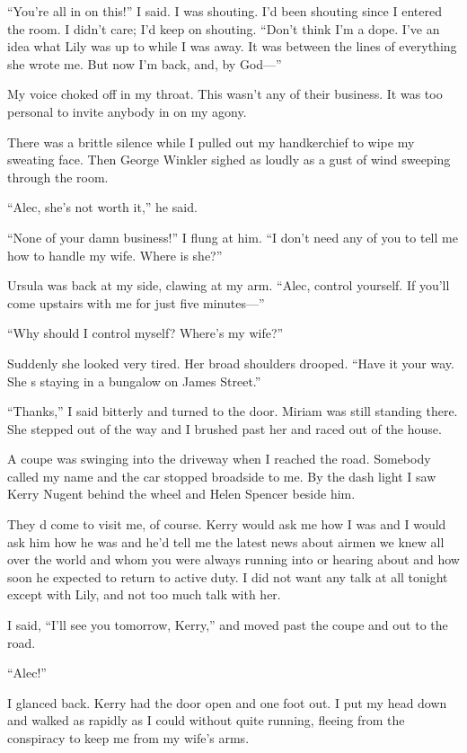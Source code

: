 \documentclass{novel}
\begin{document}
{“You’re all in on this!” I said. I was shouting. I’d been shouting since I entered the room. I didn’t care; I’d keep on shouting. “Don’t think I’m a dope. I’ve an idea what Lily was up to while I was away. It was between the lines of everything she wrote me. But now I’m back, and, by God—”

My voice choked off in my throat. This wasn’t any of their business. It was too personal to invite anybody in on my agony.

There was a brittle silence while I pulled out my handkerchief to wipe my sweating face. Then George Winkler sighed as loudly as a gust of wind sweeping through the room.

“Alec, she’s not worth it,” he said.

“None of your damn business!” I flung at him. “I don’t need any of you to tell me how to handle my wife. Where is she?”

Ursula was back at my side, clawing at my arm. “Alec, control yourself. If you’ll come upstairs with me for just five minutes—”

“Why should I control myself? Where’s my wife?”

Suddenly she looked very tired. Her broad shoulders drooped. “Have it your way. She s staying in a bungalow on James Street.”

“Thanks,” I said bitterly and turned to the door. Miriam was still standing there. She stepped out of the way and I brushed past her and raced out of the house.

A coupe was swinging into the driveway when I reached the road. Somebody called my name and the car stopped broadside to me. By the dash light I saw Kerry Nugent behind the wheel and Helen Spencer beside him.

They d come to visit me, of course. Kerry would ask me how I was and I would ask him how he was and he’d tell me the latest news about airmen we knew all over the world and whom you were always running into or hearing about and how soon he expected to return to active duty. I did not want any talk at all tonight except with Lily, and not too much talk with her.

I said, “I’ll see you tomorrow, Kerry,” and moved past the coupe and out to the road.

“Alec!”

I glanced back. Kerry had the door open and one foot out. I put my head down and walked as rapidly as I could without quite running, fleeing from the conspiracy to keep me from my wife’s arms.

}
\end{document}
